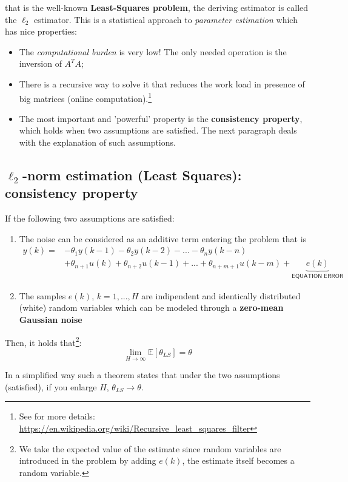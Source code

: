 that is the well-known \textbf{Least-Squares problem}, the deriving estimator is called the $\ell_2$ estimator. This is a statistical approach to \textit{parameter estimation} which has nice properties:
\begin{itemize}
    \item The \textit{computational burden} is very low! The only needed operation is the inversion of $A^T{A}$;
    \item There is a recursive way to solve it that reduces the work load in presence of big matrices (online computation).\footnote{
        See for more details: \url{https://en.wikipedia.org/wiki/Recursive_least_squares_filter}%
    }
    \item The most important and 'powerful' property is the \textbf{consistency property}, which holds when two assumptions are satisfied. The next paragraph deals with the explanation of such assumptions.
\end{itemize}

\subsection{$\ell_2$-norm estimation (Least Squares): consistency property}
\begin{theorem} If the following two assumptions are satisfied:
\begin{enumerate}
    \item The noise can be considered as an additive term entering the problem that is
    \begin{align*}
        y(k) = &-\theta_1{y(k-1)}-\theta_2{y(k-2)}-...-\theta_n{y(k-n)}\\
        &+\theta_{n+1}u(k)+\theta_{n+2}u(k-1)+...+\theta_{n+m+1}u(k-m) + \underbrace{e(k)}_{\textsf{EQUATION ERROR}}
    \end{align*}
    \item The samples $e(k)$, $k=1,...,H$ are indipendent and identically distributed (white) random variables which can be modeled through a \textbf{zero-mean Gaussian noise}
\end{enumerate}
Then, it holds that\footnote{
    We take the expected value of the estimate since random variables are introduced in the problem by adding $e(k)$, the estimate itself becomes a random variable.
}:
\begin{equation}\label{eq:consistency}
    \lim_{H\to\infty} \mathbb{E}[\theta_{LS}] = \theta
\end{equation}
\end{theorem}
In a simplified way such a theorem states that under the two assumptions (satisfied), if you enlarge $H$, $\theta_{LS}\to\theta$.

